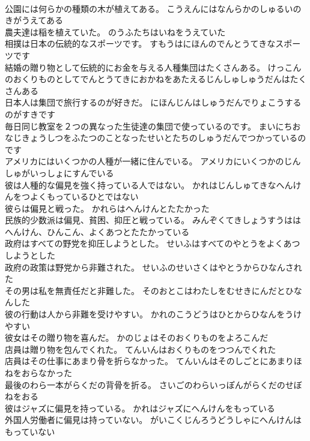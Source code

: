 \documentclass[8pt]{extreport}
\begin{document}
\begin{CJK}{UTF8}{min}
\\	公園には何らかの種類の木が植えてある。	こうえんにはなんらかのしゅるいのきがうえてある 
\\	農夫達は稲を植えていた。	のうふたちはいねをうえていた 
\\	相撲は日本の伝統的なスポーツです。	すもうはにほんのでんとうてきなスポーツです 
\\	結婚の贈り物として伝統的にお金を与える人種集団はたくさんある。	けっこんのおくりものとしてでんとうてきにおかねをあたえるじんしゅしゅうだんはたくさんある 
\\	日本人は集団で旅行するのが好きだ。	にほんじんはしゅうだんでりょこうするのがすきです 
\\	毎日同じ教室を２つの異なった生徒達の集団で使っているのです。	まいにちおなじきょうしつをふたつのことなったせいとたちのしゅうだんでつかっているのです 
\\	アメリカにはいくつかの人種が一緒に住んでいる。	アメリカにいくつかのじんしゅがいっしょにすんでいる 
\\	彼は人種的な偏見を強く持っている人ではない。	かれはじんしゅてきなへんけんをつよくもっているひとではない 
\\	彼らは偏見と戦った。	かれらはへんけんとたたかった 
\\	民族的少数派は偏見、貧困、抑圧と戦っている。	みんぞくてきしょうすうははへんけん、ひんこん、よくあつとたたかっている 
\\	政府はすべての野党を抑圧しようとした。	せいふはすべてのやとうをよくあつしようとした 
\\	政府の政策は野党から非難された。	せいふのせいさくはやとうからひなんされた 
\\	その男は私を無責任だと非難した。	そのおとこはわたしをむせきにんだとひなんした 
\\	彼の行動は人から非難を受けやすい。	かれのこうどうはひとからひなんをうけやすい 
\\	彼女はその贈り物を喜んだ。	かのじょはそのおくりものをよろこんだ 
\\	店員は贈り物を包んでくれた。	てんいんはおくりものをつつんでくれた 
\\	店員はその仕事にあまり骨を折らなかった。	てんいんはそのしごとにあまりほねをおらなかった 
\\	最後のわら一本がらくだの背骨を折る。	さいごのわらいっぽんがらくだのせぼねをおる 
\\	彼はジャズに偏見を持っている。	かれはジャズにへんけんをもっている 
\\	外国人労働者に偏見は持っていない。	がいこくじんろうどうしゃにへんけんはもっていない 

\end{CJK}
\end{document}
